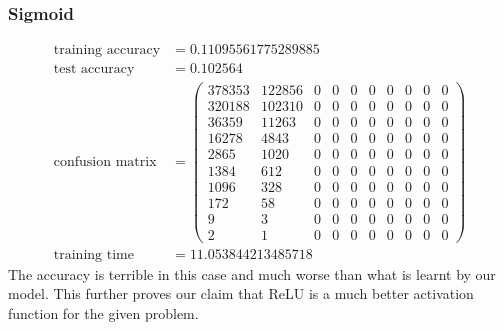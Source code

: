 \documentclass[11pt]{article}
\begin{document}
\subsubsection{Sigmoid}
\begin{equation}
  \begin{split}
    \text{training accuracy} &= 0.11095561775289885\\
    \text{test accuracy} &= 0.102564\\
    \text{confusion matrix} &=
    \begin{pmatrix}
      378353 & 122856 & 0 & 0 & 0 & 0 & 0 & 0 & 0 & 0 \\
      320188 & 102310 & 0 & 0 & 0 & 0 & 0 & 0 & 0 & 0 \\
      36359  & 11263  & 0 & 0 & 0 & 0 & 0 & 0 & 0 & 0 \\
      16278  & 4843   & 0 & 0 & 0 & 0 & 0 & 0 & 0 & 0 \\
      2865   & 1020   & 0 & 0 & 0 & 0 & 0 & 0 & 0 & 0 \\
      1384   & 612    & 0 & 0 & 0 & 0 & 0 & 0 & 0 & 0 \\
      1096   & 328    & 0 & 0 & 0 & 0 & 0 & 0 & 0 & 0 \\
      172    & 58     & 0 & 0 & 0 & 0 & 0 & 0 & 0 & 0 \\
      9      & 3      & 0 & 0 & 0 & 0 & 0 & 0 & 0 & 0 \\
      2      & 1      & 0 & 0 & 0 & 0 & 0 & 0 & 0 & 0
    \end{pmatrix}\\
    \text{training time} &= 11.053844213485718
  \end{split}
\end{equation}
The accuracy is terrible in this case and much worse than what is learnt by our model. This further proves our claim that ReLU is a much better activation function for the given problem.
\end{document}
